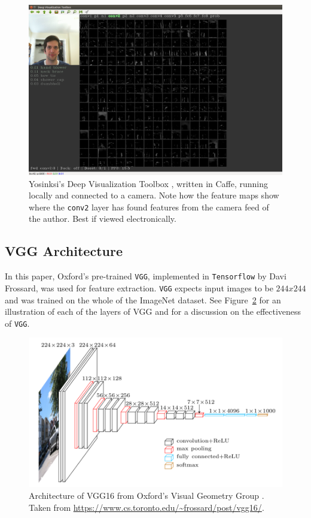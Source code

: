 \documentclass[hidelinks]{article}
\begin{document}
\begin{figure}[H]
  \centering
  \includegraphics[scale=0.17]{deepviz}
  \caption{Yosinksi's Deep Visualization Toolbox \cite{Yosinski2015}, written in Caffe, running locally and connected to a camera. Note how the feature maps show where the \texttt{conv2} layer has found features from the camera feed of the author. Best if viewed electronically.}
  \label{fig:deepviz}
\end{figure}

\subsection{VGG Architecture}\label{sec:vgg}
In this paper, Oxford's pre-trained \texttt{VGG}, implemented in \texttt{Tensorflow} by Davi Frossard, was used for feature extraction. \texttt{VGG} expects input images to be $244x244$ and was trained on the whole of the ImageNet dataset. See Figure~\ref{fig:vgg16} for an illustration of each of the layers of VGG and \cite{Simonyan2015} for a discussion on the effectiveness of \texttt{VGG}.

\begin{figure}[H]
  \centering
  \includegraphics[scale=0.84]{vgg16}
  \caption{Architecture of VGG16 from Oxford's Visual Geometry Group \cite{Simonyan2015}. Taken from \newline \url{https://www.cs.toronto.edu/~frossard/post/vgg16/}.}
  \label{fig:vgg16}
\end{figure}
\end{document}
